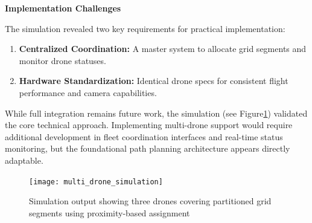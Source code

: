 \textbf{Implementation Challenges}

The simulation revealed two key requirements for practical implementation:
\begin{enumerate}
    \item \textbf{Centralized Coordination:} A master system to allocate grid segments and monitor drone statuses.
    \item \textbf{Hardware Standardization:} Identical drone specs for consistent flight performance and camera capabilities.
\end{enumerate}

While full integration remains future work, the simulation (see Figure\ref{fig:multi_drone}) validated the core technical approach. Implementing multi-drone support would require additional development in fleet coordination interfaces and real-time status monitoring, but the foundational path planning architecture appears directly adaptable.

\begin{figure}[h]
    \centering
    \texttt{[image: multi\_drone\_simulation]}
    \caption{Simulation output showing three drones covering partitioned grid segments using proximity-based assignment}
    \label{fig:multi_drone}
\end{figure}
